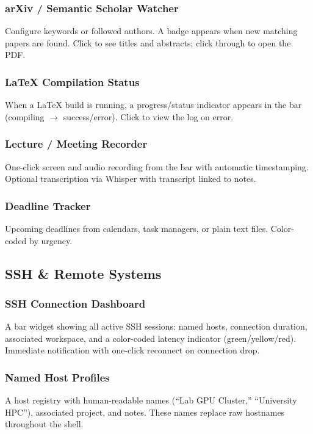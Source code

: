 \documentclass[11pt,a4paper]{article}
\begin{document}
\subsubsection{arXiv / Semantic Scholar Watcher}
Configure keywords or followed authors. A badge appears when new matching papers are found. Click to see titles and abstracts; click through to open the PDF.

\subsubsection{\LaTeX{} Compilation Status}
When a \LaTeX{} build is running, a progress/status indicator appears in the bar (compiling $\to$ success/error). Click to view the log on error.

\subsubsection{Lecture / Meeting Recorder}
One-click screen and audio recording from the bar with automatic timestamping. Optional transcription via Whisper with transcript linked to notes.

\subsubsection{Deadline Tracker}
Upcoming deadlines from calendars, task managers, or plain text files. Color-coded by urgency.


\subsection{SSH \& Remote Systems}
\label{sec:features-ssh}

\subsubsection{SSH Connection Dashboard}
A bar widget showing all active SSH sessions: named hosts, connection duration, associated workspace, and a color-coded latency indicator (green/yellow/red). Immediate notification with one-click reconnect on connection drop.

\subsubsection{Named Host Profiles}
A host registry with human-readable names (``Lab GPU Cluster,'' ``University HPC''), associated project, and notes. These names replace raw hostnames throughout the shell.
\end{document}
